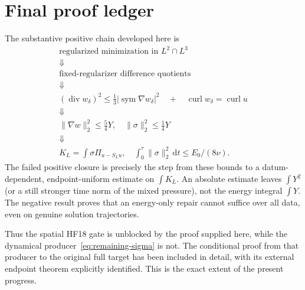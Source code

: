 \documentclass[11pt,a4paper]{article}
\theoremstyle{definition}
\newcommand{\dt}{\,\mathrm dt}
\DeclareMathOperator{\diver}{div}
\DeclareMathOperator{\curl}{curl}
\DeclareMathOperator{\sym}{sym}
\begin{document}
\section{Final proof ledger}
The substantive positive chain developed here is
\[
 \begin{gathered}
 \text{regularized minimization in }L^2\cap L^3\\
 \Downarrow\\
 \text{fixed-regularizer difference quotients}\\
 \Downarrow\\
 (\diver w_\delta)^2\le\tfrac13|\sym\nabla w_\delta|^2
 \quad+\quad\curl w_\delta=\curl u\\
 \Downarrow\\
 \|\nabla w\|_2^2\le\tfrac54Y,\quad
 \|\sigma\|_2^2\le\tfrac14Y\\
 \Downarrow\\
 K_L=\int\sigma\Pi_{u-S_Lu},\quad
 \int_0^\tau\|\sigma\|_2^2\dt\le E_0/(8\nu).
 \end{gathered}
\]
The failed positive closure is precisely the step from these bounds to a datum-dependent, endpoint-uniform estimate on $\int K_L$. An absolute estimate leaves $\int Y^2$ (or a still stronger time norm of the mixed pressure), not the energy integral $\int Y$. The negative result proves that an energy-only repair cannot suffice over all data, even on genuine solution trajectories.

Thus the spatial HF18 gate is unblocked by the proof supplied here, while the dynamical producer~\eqref{eq:remaining-sigma} is not. The conditional proof from that producer to the original full target has been included in detail, with its external endpoint theorem explicitly identified. This is the exact extent of the present progress.
\end{document}
